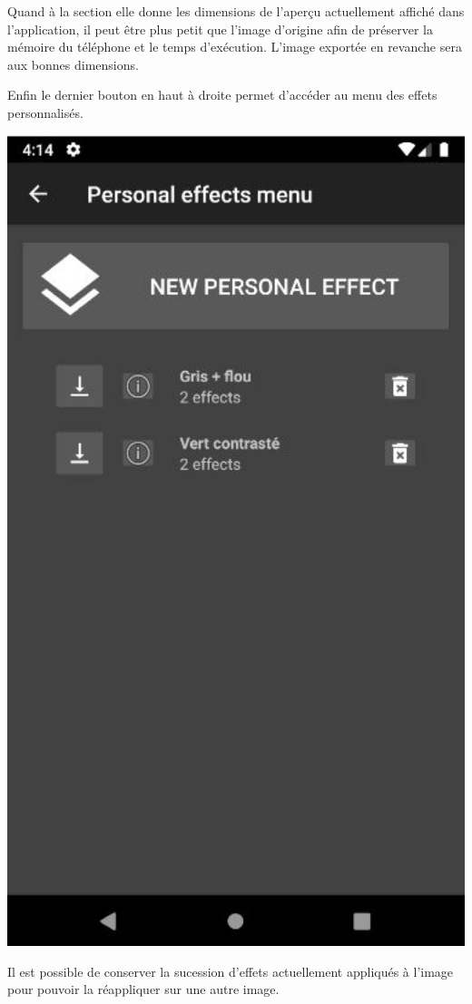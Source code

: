 \begin{center}
\begin{minipage}{.48\textwidth}
        Quand à la section {\faCog} elle donne les dimensions de l'aperçu actuellement affiché dans l'application, il peut être plus petit que l'image d'origine afin de préserver la mémoire du téléphone et le temps d'exécution. L'image exportée en revanche sera aux bonnes dimensions.
    \end{minipage}
\end{center}
\clearpage


Enfin le dernier bouton en haut à droite permet d'accéder au menu des effets personnalisés.
\begin{center}
    \begin{minipage}{.48\textwidth}
      \includegraphics[width=1\textwidth]{report_src/app_manual/macro_menu_preview.JPG}
    \end{minipage}
    \begin{minipage}{.48\textwidth}
        Il est possible de conserver la sucession d'effets actuellement appliqués à l'image pour pouvoir la réappliquer sur une autre image.


\end{minipage}
\end{center}
